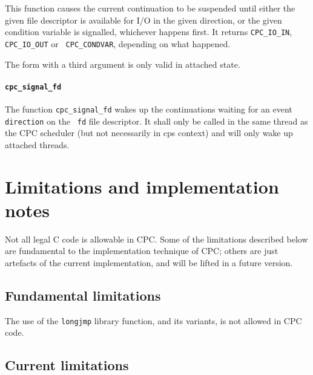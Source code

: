 \documentclass[a4paper]{report}
\begin{document}
This function causes the current continuation to be suspended until
either the given file descriptor is available for I/O in the given
direction, or the given condition variable is signalled, whichever
happens first.  It returns {\tt CPC\_IO\_IN}, {\tt CPC\_IO\_OUT} or {\tt
CPC\_CONDVAR}, depending on what happened.

The form with a third argument is only valid in attached state.

\paragraph{\tt cpc\_signal\_fd} The function {\tt cpc\_signal\_fd} wakes
up the continuations waiting for an event {\tt direction} on the {\tt
fd} file descriptor.  It shall only be called in the same thread as the
CPC scheduler (but not necessarily in cps context) and will only wake up
attached threads.

\section{Limitations and implementation notes}

Not all legal C code is allowable in CPC.  Some of the limitations
described below are fundamental to the implementation technique of
CPC; others are just artefacts of the current implementation, and will
be lifted in a future version.

\subsection{Fundamental limitations}

The use of the {\tt longjmp} library function, and its variants, is
not allowed in CPC code.

\subsection{Current limitations}
\end{document}

